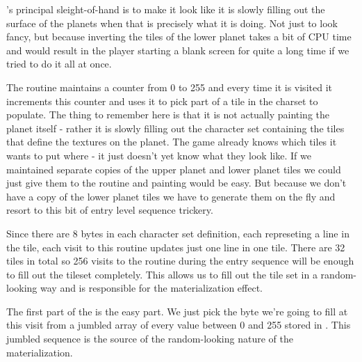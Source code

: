 's principal sleight-of-hand is to make it look like it is slowly filling
out the surface of the planets when that is precisely what it is doing. Not just to look fancy, but because
inverting the tiles of the lower planet takes a bit of CPU time and would result in the player starting a blank screen
for quite a long time if we tried to do it all at once.

The routine maintains a counter from 0 to 255 and every time it is visited it increments this counter and uses it
to pick part of a tile in the charset to populate. The thing to remember here is that it is not actually painting the planet
itself - rather it is slowly filling out the character set containing the tiles that define the textures on the planet.
The game already knows which tiles it wants to put where - it just doesn't yet know what they look like. If we maintained
separate copies of the upper planet and lower planet tiles we could just give them to the routine and painting would be easy.
But because we don't have a copy of the lower planet tiles we have to generate them on the fly and resort to this
bit of entry level sequence trickery.

Since there are 8 bytes in each character set definition, each represeting a line in the tile, 
each visit to this routine updates just one line in one tile. There are 32 tiles in total so 256 visits to the routine
during the entry sequence will be enough to fill out the tileset completely. This allows
us to fill out the tile set in a random-looking way and is responsible for the materialization effect.

The first part of the  is the easy part. We just pick the byte we're going to fill
at this visit from a jumbled array of every value between 0 and 255 stored in . This jumbled
sequence is the source of the random-looking nature of the materialization.

